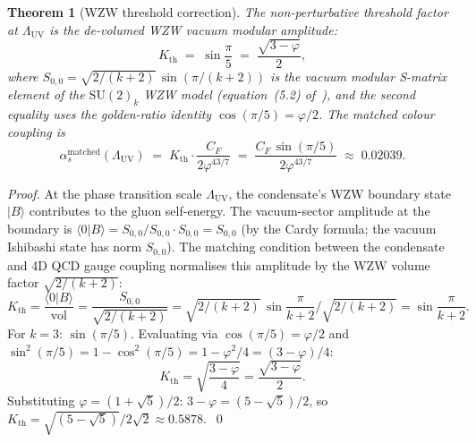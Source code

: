 \documentclass[11pt,a4paper]{article}
\newtheorem{theorem}{Theorem}[section]
\theoremstyle{definition}
\theoremstyle{remark}
\newcommand{\vp}{\varphi}
\newcommand{\LUV}{\Lambda_{\mathrm{UV}}}
\begin{document}
\begin{theorem}[WZW threshold correction]
\label{P5:thm:Kth}
The non-perturbative threshold factor at $\LUV$ is the de-volumed
WZW vacuum modular amplitude:
\begin{equation}
  \boxed{K_{\mathrm{th}}
  \;=\; \sin\frac{\pi}{5}
  \;=\; \frac{\sqrt{3-\vp}}{2},}
  \label{P5:eq:Kth_exact}
\end{equation}
where $S_{0,0} = \sqrt{2/(k+2)}\,\sin(\pi/(k+2))$ is the vacuum
modular S-matrix element of the $\mathrm{SU}(2)_k$ WZW model
(equation~(5.2) of~\cite{Paper1,Verlinde1988}), and the second equality uses the
golden-ratio identity $\cos(\pi/5) = \vp/2$.
The matched colour coupling is
\begin{equation}
  \alpha_s^{\mathrm{matched}}(\LUV)
  \;=\; K_{\mathrm{th}}\cdot\frac{C_F}{2\vp^{43/7}}
  \;=\; \frac{C_F\,\sin(\pi/5)}{2\vp^{43/7}}
  \;\approx\; 0.02039.
  \label{P5:eq:as_matched}
\end{equation}
\end{theorem}

\begin{proof}
At the phase transition scale $\LUV$, the condensate's WZW boundary
state $|B\rangle$ contributes to the gluon self-energy.
The vacuum-sector amplitude at the boundary is
$\langle 0|B\rangle = S_{0,0}/S_{0,0} \cdot S_{0,0} = S_{0,0}$
(by the Cardy formula; the vacuum Ishibashi state has norm $S_{0,0}$).
The matching condition between the condensate and 4D QCD gauge coupling
normalises this amplitude by the WZW volume factor $\sqrt{2/(k+2)}$:
\begin{equation}
  K_{\mathrm{th}}
  = \frac{\langle 0|B\rangle}{\text{vol}} 
  = \frac{S_{0,0}}{\sqrt{2/(k+2)}}
  = \sqrt{2/(k+2)}\,\sin\!\frac{\pi}{k+2}\Big/\sqrt{2/(k+2)}
  = \sin\!\frac{\pi}{k+2}.
  \label{P5:eq:Kth_proof}
\end{equation}
For $k=3$: $\sin(\pi/5)$.  Evaluating via $\cos(\pi/5)=\vp/2$ and
$\sin^2(\pi/5)=1-\cos^2(\pi/5)=1-\vp^2/4=(3-\vp)/4$:
\begin{equation}
  K_{\mathrm{th}}
  = \sqrt{\frac{3-\vp}{4}}
  = \frac{\sqrt{3-\vp}}{2}.
  \label{P5:eq:Kth_golden}
\end{equation}
Substituting $\vp=(1+\sqrt{5})/2$: $3-\vp = (5-\sqrt{5})/2$, so
$K_{\mathrm{th}} = \sqrt{(5-\sqrt{5})}/2\sqrt{2}\approx 0.5878$.~\qed
\end{proof}
\end{document}
